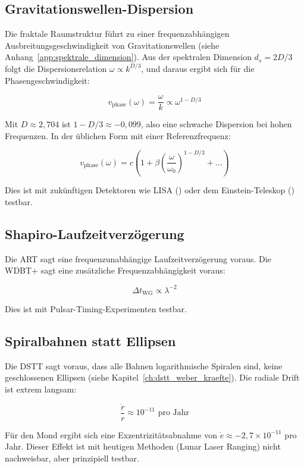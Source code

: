\subsection{Gravitationswellen-Dispersion}
\label{sub:vorh_gw_dispersion}

Die fraktale Raumstruktur führt zu einer frequenzabhängigen Ausbreitungsgeschwindigkeit von Gravitationswellen (siehe Anhang~\ref{app:spektrale_dimension}). Aus der spektralen Dimension \( d_s = 2D/3 \) folgt die Dispersionsrelation \( \omega \propto k^{D/3} \), und daraus ergibt sich für die Phasengeschwindigkeit:

\[
v_{\text{phase}}(\omega) = \frac{\omega}{k} \propto \omega^{1 - D/3}
\]

Mit \( D \approx 2,704 \) ist \( 1 - D/3 \approx -0,099 \), also eine schwache Dispersion bei hohen Frequenzen. In der üblichen Form mit einer Referenzfrequenz:

\[
v_{\text{phase}}(\omega) = c \left(1 + \beta \left(\frac{\omega}{\omega_0}\right)^{1 - D/3} + \dots\right)
\]

Dies ist mit zukünftigen Detektoren wie LISA (\cite{LISA2017}) oder dem Einstein-Teleskop (\cite{EinsteinTeleskop2010}) testbar.

\subsection{Shapiro-Laufzeitverzögerung}
\label{sub:vorh_shapiro}

Die ART sagt eine frequenzunabhängige Laufzeitverzögerung voraus. Die WDBT+ sagt eine zusätzliche Frequenzabhängigkeit voraus:

\[
\Delta t_{\text{WG}} \propto \lambda^{-2}
\]

Dies ist mit Pulsar-Timing-Experimenten testbar.

\subsection{Spiralbahnen statt Ellipsen}
\label{sub:vorh_spiralbahnen}

Die DSTT sagt voraus, dass alle Bahnen logarithmische Spiralen sind, keine geschlossenen Ellipsen (siehe Kapitel~\ref{ch:dstt_weber_kraefte}). Die radiale Drift ist extrem langsam:

\[
\frac{\dot{r}}{r} \approx 10^{-11} \text{ pro Jahr}
\]

Für den Mond ergibt sich eine Exzentrizitätsabnahme von \( \dot{e} \approx -2,7 \times 10^{-11} \) pro Jahr. Dieser Effekt ist mit heutigen Methoden (Lunar Laser Ranging) nicht nachweisbar, aber prinzipiell testbar.

